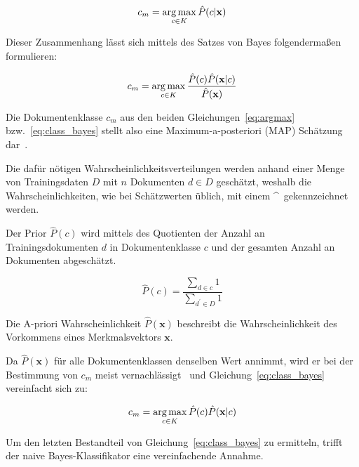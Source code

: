         \begin{equation}
            c_{m} = \operatorname*{arg\,max}_{c \in K} \hat{P}(c|\mathbf{x})
            \label{eq:argmax}
        \end{equation}

        Dieser Zusammenhang lässt sich mittels des Satzes von Bayes folgendermaßen formulieren:

        \begin{equation}
            c_{m} = \operatorname*{arg\,max}_{c \in K} \frac{\hat{P}(c)\hat{P}(\mathbf{x}|c)}{\hat{P}(\mathbf{x})}
            \label{eq:class_bayes}
        \end{equation}

        Die Dokumentenklasse $c_{m}$ aus den beiden Gleichungen~\ref{eq:argmax} bzw.~\ref{eq:class_bayes} stellt also eine Maximum-a-posteriori (MAP) Schätzung dar~\cite{IIR}. 

        Die dafür nötigen Wahrscheinlichkeitsverteilungen werden anhand einer Menge von Trainingsdaten $D$ mit $n$ Dokumenten $d \in D$ geschätzt, weshalb die Wahrscheinlichkeiten, wie bei Schätzwerten üblich, mit einem \^~gekennzeichnet werden.

        Der Prior $\hat{P}(c)$ wird mittels des Quotienten der Anzahl an Trainingsdokumenten $d$ in Dokumentenklasse $c$ und der gesamten Anzahl an Dokumenten abgeschätzt.

        \begin{equation}
            \hat{P}(c) = \frac{\sum_{d \in c}1}{\sum_{d^{'} \in D}1}
            \label{eq:a_priori_c}
        \end{equation}

        Die A-priori Wahrscheinlichkeit $\hat{P}(\mathbf{x})$ beschreibt die Wahrscheinlichkeit des Vorkommens eines Merkmalsvektors $\mathbf{x}$.

        Da $\hat{P}(\mathbf{x})$ für alle Dokumentenklassen denselben Wert annimmt, wird er bei der Bestimmung von $c_{m}$ meist vernachlässigt~\cite{nbindependence,IIR} und Gleichung~\ref{eq:class_bayes} vereinfacht sich zu:

        \begin{equation}
            c_{m} = \operatorname*{arg\,max}_{c \in K}\hat{P}(c)\hat{P}(\mathbf{x}|c)
            \label{eq:class_bayes_2}
        \end{equation}

        Um den letzten Bestandteil von Gleichung~\ref{eq:class_bayes} zu ermitteln, trifft der naive Bayes-Klassifikator eine vereinfachende Annahme.

